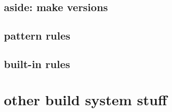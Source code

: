 

\subsection{aside: make versions}



\subsection{pattern rules}



\subsection{built-in rules}



\section{other build system stuff}



